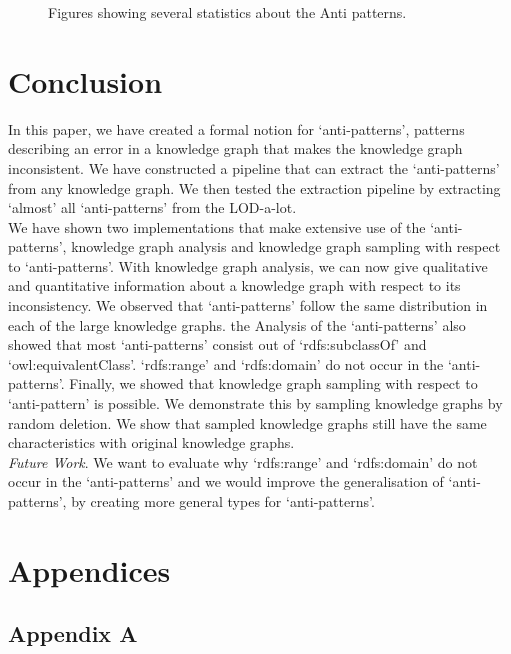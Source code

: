 \documentclass{article}
\begin{document}
\begin{figure}[ht]
{	}
	\caption{Figures showing several statistics about the Anti patterns.}
	\label{fig:Antipattern}
\end{figure}

\newpage
\section{Conclusion}
In this paper, we have created a formal notion for `anti-patterns', patterns describing an error in a knowledge graph that makes the knowledge graph inconsistent. 
We have constructed a pipeline that can extract the `anti-patterns' from any knowledge graph. We then tested the extraction pipeline by extracting `almost' all `anti-patterns' from the LOD-a-lot. \\
We have shown two implementations that make extensive use of the `anti-patterns', knowledge graph analysis and knowledge graph sampling with respect to `anti-patterns'.
With knowledge graph analysis, we can now give qualitative and quantitative information about a knowledge graph with respect to its inconsistency. 
We observed that `anti-patterns' follow the same distribution in each of the large knowledge graphs. the Analysis of the `anti-patterns' also showed that most `anti-patterns' consist out of `rdfs:subclassOf' and `owl:equivalentClass'. `rdfs:range' and `rdfs:domain' do not occur in the `anti-patterns'.
Finally, we showed that knowledge graph sampling with respect to `anti-pattern' is possible. We demonstrate this by sampling knowledge graphs by random deletion.
We show that sampled knowledge graphs still have the same characteristics with original knowledge graphs.\\
\textit{Future Work}. We want to evaluate why `rdfs:range' and `rdfs:domain' do not occur in the `anti-patterns' and we would improve the generalisation of `anti-patterns', by creating more general types for `anti-patterns'. 

\newpage



\newpage
\section{Appendices}
\subsection{Appendix A}
\end{document}

